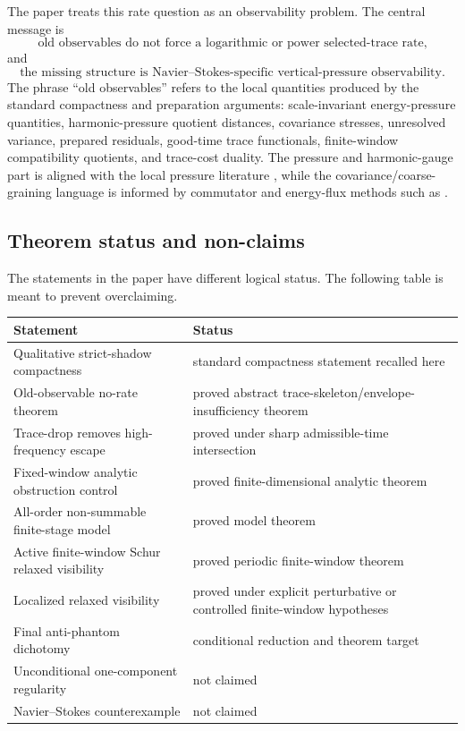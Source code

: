\documentclass[11pt]{article}
\numberwithin{equation}{section}
\begin{document}
The paper treats this rate question as an observability problem. The central message is
\[
\boxed{\text{old observables do not force a logarithmic or power selected-trace rate,}}
\]
and
\[
\boxed{\text{the missing structure is Navier--Stokes-specific vertical-pressure observability.}}
\]
The phrase ``old observables'' refers to the local quantities produced by the standard compactness and preparation arguments: scale-invariant energy-pressure quantities, harmonic-pressure quotient distances, covariance stresses, unresolved variance, prepared residuals, good-time trace functionals, finite-window compatibility quotients, and trace-cost duality.  The pressure and harmonic-gauge part is aligned with the local pressure literature \cite{SohrWahl1986,Wolf2017,Yu2026HarmonicPressure}, while the covariance/coarse-graining language is informed by commutator and energy-flux methods such as \cite{ConstantinETiti1994}.

\subsection{Theorem status and non-claims}
The statements in the paper have different logical status. The following table is meant to prevent overclaiming.
\begin{center}
\begin{tabularx}{0.96\textwidth}{@{}p{}X@{}}
\toprule
Statement & Status \\
\midrule
Qualitative strict-shadow compactness & standard compactness statement recalled here \\
Old-observable no-rate theorem & proved abstract trace-skeleton/envelope-insufficiency theorem \\
Trace-drop removes high-frequency escape & proved under sharp admissible-time intersection \\
Fixed-window analytic obstruction control & proved finite-dimensional analytic theorem \\
All-order non-summable finite-stage model & proved model theorem \\
Active finite-window Schur relaxed visibility & proved periodic finite-window theorem \\
Localized relaxed visibility & proved under explicit perturbative or controlled finite-window hypotheses \\
Final anti-phantom dichotomy & conditional reduction and theorem target \\
Unconditional one-component regularity & not claimed \\
Navier--Stokes counterexample & not claimed \\
\bottomrule
\end{tabularx}
\end{center}
\end{document}
